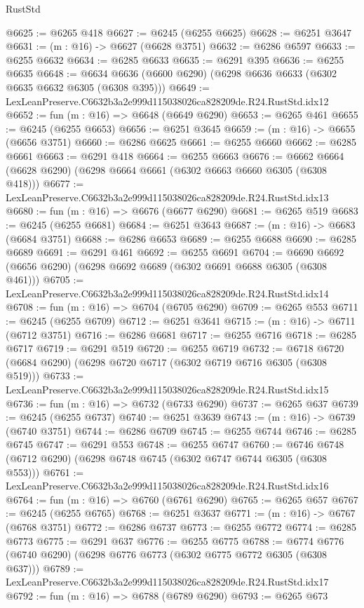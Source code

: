 \begin{lexlean}{RustStd}
\begin{coremodule}
@6625 := @6265 @418
@6627 := @6245 (@6255 @6625)
@6628 := @6251 @3647
@6631 := (m : @16) -> @6627 (@6628 @3751)
@6632 := @6286 @6597
@6633 := @6255 @6632
@6634 := @6285 @6633
@6635 := @6291 @395
@6636 := @6255 @6635
@6648 := @6634 @6636 (@6600 @6290) (@6298 @6636 @6633 (@6302 @6635 @6632 @6305 (@6308 @395)))
@6649 := LexLeanPreserve.C6632b3a2e999d115038026ca828209de.R24.RustStd.idx12
@6652 := fun (m : @16) => @6648 (@6649 @6290)
@6653 := @6265 @461
@6655 := @6245 (@6255 @6653)
@6656 := @6251 @3645
@6659 := (m : @16) -> @6655 (@6656 @3751)
@6660 := @6286 @6625
@6661 := @6255 @6660
@6662 := @6285 @6661
@6663 := @6291 @418
@6664 := @6255 @6663
@6676 := @6662 @6664 (@6628 @6290) (@6298 @6664 @6661 (@6302 @6663 @6660 @6305 (@6308 @418)))
@6677 := LexLeanPreserve.C6632b3a2e999d115038026ca828209de.R24.RustStd.idx13
@6680 := fun (m : @16) => @6676 (@6677 @6290)
@6681 := @6265 @519
@6683 := @6245 (@6255 @6681)
@6684 := @6251 @3643
@6687 := (m : @16) -> @6683 (@6684 @3751)
@6688 := @6286 @6653
@6689 := @6255 @6688
@6690 := @6285 @6689
@6691 := @6291 @461
@6692 := @6255 @6691
@6704 := @6690 @6692 (@6656 @6290) (@6298 @6692 @6689 (@6302 @6691 @6688 @6305 (@6308 @461)))
@6705 := LexLeanPreserve.C6632b3a2e999d115038026ca828209de.R24.RustStd.idx14
@6708 := fun (m : @16) => @6704 (@6705 @6290)
@6709 := @6265 @553
@6711 := @6245 (@6255 @6709)
@6712 := @6251 @3641
@6715 := (m : @16) -> @6711 (@6712 @3751)
@6716 := @6286 @6681
@6717 := @6255 @6716
@6718 := @6285 @6717
@6719 := @6291 @519
@6720 := @6255 @6719
@6732 := @6718 @6720 (@6684 @6290) (@6298 @6720 @6717 (@6302 @6719 @6716 @6305 (@6308 @519)))
@6733 := LexLeanPreserve.C6632b3a2e999d115038026ca828209de.R24.RustStd.idx15
@6736 := fun (m : @16) => @6732 (@6733 @6290)
@6737 := @6265 @637
@6739 := @6245 (@6255 @6737)
@6740 := @6251 @3639
@6743 := (m : @16) -> @6739 (@6740 @3751)
@6744 := @6286 @6709
@6745 := @6255 @6744
@6746 := @6285 @6745
@6747 := @6291 @553
@6748 := @6255 @6747
@6760 := @6746 @6748 (@6712 @6290) (@6298 @6748 @6745 (@6302 @6747 @6744 @6305 (@6308 @553)))
@6761 := LexLeanPreserve.C6632b3a2e999d115038026ca828209de.R24.RustStd.idx16
@6764 := fun (m : @16) => @6760 (@6761 @6290)
@6765 := @6265 @657
@6767 := @6245 (@6255 @6765)
@6768 := @6251 @3637
@6771 := (m : @16) -> @6767 (@6768 @3751)
@6772 := @6286 @6737
@6773 := @6255 @6772
@6774 := @6285 @6773
@6775 := @6291 @637
@6776 := @6255 @6775
@6788 := @6774 @6776 (@6740 @6290) (@6298 @6776 @6773 (@6302 @6775 @6772 @6305 (@6308 @637)))
@6789 := LexLeanPreserve.C6632b3a2e999d115038026ca828209de.R24.RustStd.idx17
@6792 := fun (m : @16) => @6788 (@6789 @6290)
@6793 := @6265 @673

\end{coremodule}
\end{lexlean}
